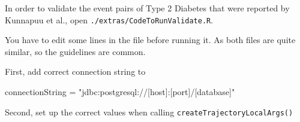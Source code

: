 \documentclass[
]{article}
\newenvironment{Shaded}{\begin{snugshade}}{\end{snugshade}}
\newcommand{\NormalTok}[1]{#1}
\newcommand{\OtherTok}[1]{\textcolor[rgb]{0.56,0.35,0.01}{#1}}
\newcommand{\StringTok}[1]{\textcolor[rgb]{0.31,0.60,0.02}{#1}}
\begin{document}
In order to validate the event pairs of Type 2 Diabetes that were
reported by Kunnapuu et al., open \texttt{./extras/CodeToRunValidate.R}.

You have to edit some lines in the file before running it. As both files
are quite similar, so the guidelines are common.

First, add correct connection string to

\begin{Shaded}
\begin{Highlighting}[]
\NormalTok{connectionString }\OtherTok{=} \StringTok{"jdbc:postgresql://[host]:[port]/[database]"}
\end{Highlighting}
\end{Shaded}

Second, set up the correct values when calling
\texttt{createTrajectoryLocalArgs()}
\end{document}
